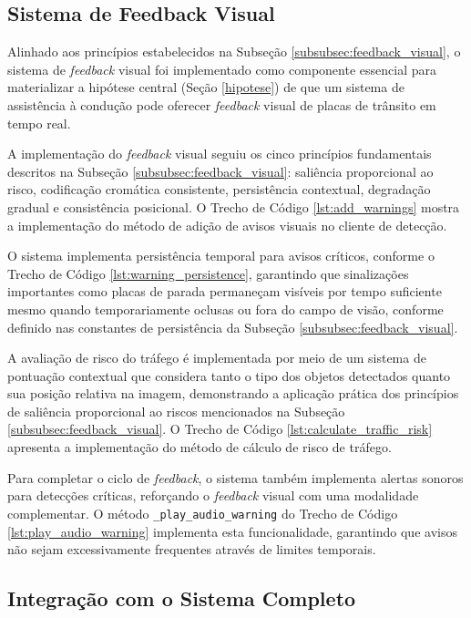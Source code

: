 \subsection{Sistema de Feedback Visual} \label{subsec:implementacao_feedback_visual}

Alinhado aos princípios estabelecidos na Subseção \ref{subsubsec:feedback_visual}, o sistema de \textit{feedback} visual foi implementado como componente essencial para materializar a hipótese central (Seção \ref{hipotese}) de que um sistema de assistência à condução pode oferecer \textit{feedback} visual de placas de trânsito em tempo real.

A implementação do \textit{feedback} visual seguiu os cinco princípios fundamentais descritos na Subseção \ref{subsubsec:feedback_visual}: saliência proporcional ao risco, codificação cromática consistente, persistência contextual, degradação gradual e consistência posicional. O Trecho de Código \ref{lst:add_warnings} mostra a implementação do método de adição de avisos visuais no cliente de detecção.

O sistema implementa persistência temporal para avisos críticos, conforme o Trecho de Código \ref{lst:warning_persistence}, garantindo que sinalizações importantes como placas de parada permaneçam visíveis por tempo suficiente mesmo quando temporariamente oclusas ou fora do campo de visão, conforme definido nas constantes de persistência da Subseção \ref{subsubsec:feedback_visual}.

A avaliação de risco do tráfego é implementada por meio de um sistema de pontuação contextual que considera tanto o tipo dos objetos detectados quanto sua posição relativa na imagem, demonstrando a aplicação prática dos princípios de saliência proporcional ao riscos mencionados na Subseção \ref{subsubsec:feedback_visual}. O Trecho de Código \ref{lst:calculate_traffic_risk} apresenta a implementação do método de cálculo de risco de tráfego.

Para completar o ciclo de \textit{feedback}, o sistema também implementa alertas sonoros para detecções críticas, reforçando o \textit{feedback} visual com uma modalidade complementar. O método \texttt{\_play\_audio\_warning} do Trecho de Código \ref{lst:play_audio_warning} implementa esta funcionalidade, garantindo que avisos não sejam excessivamente frequentes através de limites temporais.

\subsection{Integração com o Sistema Completo} \label{subsec:integracao_percepcao}

